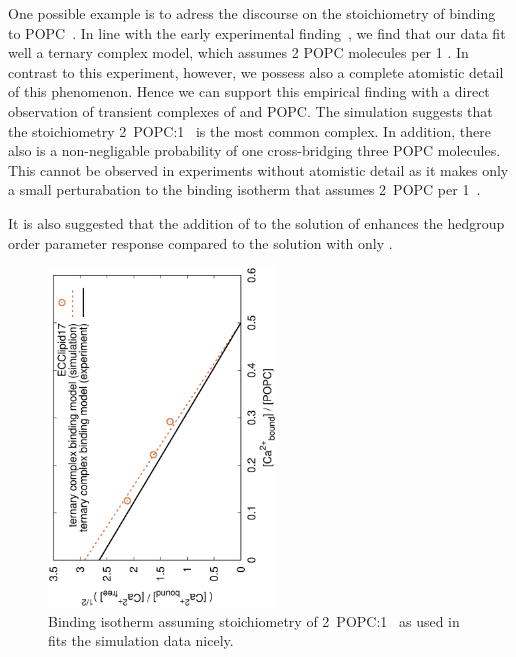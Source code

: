 \documentclass[aip,jcp,twocolumn]{revtex4}
\begin{document}
One possible example is to adress the discourse on the stoichiometry of  binding 
to POPC~\cite{altenbach84}.
In line with the early experimental finding~\cite{altenbach84}, we find that our data 
fit well a ternary complex model, which assumes 2 POPC molecules per 1 . 
In contrast to this experiment, however, we possess also a complete atomistic detail of this phenomenon.
Hence we can support this empirical finding with a direct observation of transient complexes of  and POPC.
The simulation suggests that the stoichiometry 2~POPC:1~ is the most common complex. 
In addition, there also is a non-negligable probability of one  cross-bridging three POPC molecules. 
This cannot be observed in experiments without atomistic detail as it makes only a small perturabation to 
the binding isotherm that assumes 2~POPC per 1~. 

It is also suggested that the addition of  to the solution of  enhances the hedgroup 
order parameter response compared to the solution with only . \cite{altenbach84}


\begin{figure}[]
  \centering
  \includegraphics[height=9.0cm,angle=-90]{../Fig/bound-CAs_conc-eccl17.eps}
  \caption{\label{fig:cacl-bind}
    Binding isotherm assuming stoichiometry of 2~POPC:1~ as used in \cite{Altenbach84} fits the simulation data nicely.}
\end{figure}
\end{document}
